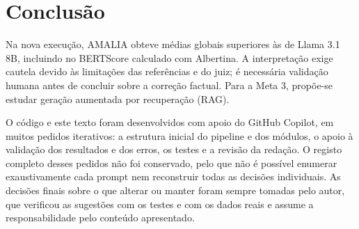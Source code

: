 \section{Conclusão}

Na nova execução, AMALIA obteve médias globais superiores às de Llama 3.1 8B, incluindo no BERTScore calculado com Albertina. A interpretação exige cautela devido às limitações das referências e do juiz; é necessária validação humana antes de concluir sobre a correção factual. Para a Meta 3, propõe-se estudar geração aumentada por recuperação (RAG).

O código e este texto foram desenvolvidos com apoio do GitHub Copilot, em muitos pedidos iterativos: a estrutura inicial do pipeline e dos módulos, o apoio à validação dos resultados e dos erros, os testes e a revisão da redação. O registo completo desses pedidos não foi conservado, pelo que não é possível enumerar exaustivamente cada prompt nem reconstruir todas as decisões individuais. As decisões finais sobre o que alterar ou manter foram sempre tomadas pelo autor, que verificou as sugestões com os testes e com os dados reais e assume a responsabilidade pelo conteúdo apresentado.
